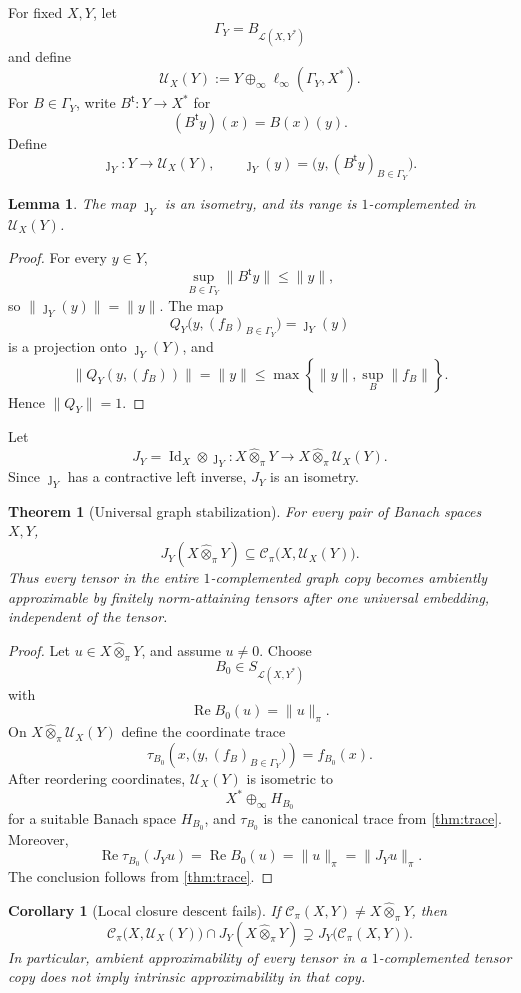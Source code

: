 \documentclass[11pt]{article}
\newtheorem{theorem}{Theorem}[section]
\newtheorem{lemma}[lemma]{Lemma}
\newtheorem{corollary}[corollary]{Corollary}
\theoremstyle{definition}
\theoremstyle{remark}
\newcommand{\whot}{\widehat\otimes_\pi}
\newcommand{\Lin}{\mathcal L}
\newcommand{\Rea}{\operatorname{Re}}
\newcommand{\id}{\operatorname{Id}}
\newcommand{\Cpi}{\mathscr C_\pi}
\newcommand{\U}{\mathcal U}
\begin{document}
For fixed $X,Y$, let
\[
 \Gamma_Y=B_{\Lin(X,Y^*)}
\]
and define
\[
 \U_X(Y)
 :=Y\oplus_\infty\ell_\infty(\Gamma_Y,X^*).
\]
For $B\in\Gamma_Y$, write $B^{\mathsf t}:Y\to X^*$ for
\[
 (B^{\mathsf t}y)(x)=B(x)(y).
\]
Define
\[
 \jmath_Y:Y\longrightarrow\U_X(Y),
 \qquad
 \jmath_Y(y)=\bigl(y,(B^{\mathsf t}y)_{B\in\Gamma_Y}\bigr).
\]

\begin{lemma}\label{lem:graph-complemented}
The map $\jmath_Y$ is an isometry, and its range is $1$-complemented in $\U_X(Y)$.
\end{lemma}

\begin{proof}
For every $y\in Y$,
\[
 \sup_{B\in\Gamma_Y}\|B^{\mathsf t}y\|\leq\|y\|,
\]
so $\|\jmath_Y(y)\|=\|y\|$.  The map
\[
 Q_Y\bigl(y,(f_B)_{B\in\Gamma_Y}\bigr)=\jmath_Y(y)
\]
is a projection onto $\jmath_Y(Y)$, and
\[
 \|Q_Y(y,(f_B))\|=\|y\|
 \leq\max\left\{\|y\|,\sup_B\|f_B\|\right\}.
\]
Hence $\|Q_Y\|=1$.
\end{proof}

Let
\[
 J_Y=\id_X\otimes\jmath_Y:X\whot Y\longrightarrow X\whot\U_X(Y).
\]
Since $\jmath_Y$ has a contractive left inverse, $J_Y$ is an isometry.

\begin{theorem}[Universal graph stabilization]\label{thm:universal-graph}
For every pair of Banach spaces $X,Y$,
\[
 J_Y(X\whot Y)\subseteq\Cpi\bigl(X,\U_X(Y)\bigr).
\]
Thus every tensor in the entire $1$-complemented graph copy becomes ambiently approximable by finitely norm-attaining tensors after one universal embedding, independent of the tensor.
\end{theorem}

\begin{proof}
Let $u\in X\whot Y$, and assume $u\neq0$.  Choose
\[
 B_0\in S_{\Lin(X,Y^*)}
\]
with
\[
 \Rea B_0(u)=\|u\|_\pi.
\]
On $X\whot\U_X(Y)$ define the coordinate trace
\[
 \tau_{B_0}\left(x,\bigl(y,(f_B)_{B\in\Gamma_Y}\bigr)\right)
 =f_{B_0}(x).
\]
After reordering coordinates, $\U_X(Y)$ is isometric to
\[
 X^*\oplus_\infty H_{B_0}
\]
for a suitable Banach space $H_{B_0}$, and $\tau_{B_0}$ is the canonical trace from \cref{thm:trace}.  Moreover,
\[
 \Rea\tau_{B_0}(J_Yu)
 =\Rea B_0(u)
 =\|u\|_\pi
 =\|J_Yu\|_\pi.
\]
The conclusion follows from \cref{thm:trace}.
\end{proof}

\begin{corollary}[Local closure descent fails]\label{cor:local-fails}
If $\Cpi(X,Y)\neq X\whot Y$, then
\[
 \Cpi\bigl(X,\U_X(Y)\bigr)
 \cap J_Y(X\whot Y)
 \supsetneq J_Y\bigl(\Cpi(X,Y)\bigr).
\]
In particular, ambient approximability of every tensor in a $1$-complemented tensor copy does not imply intrinsic approximability in that copy.
\end{corollary}
\end{document}
